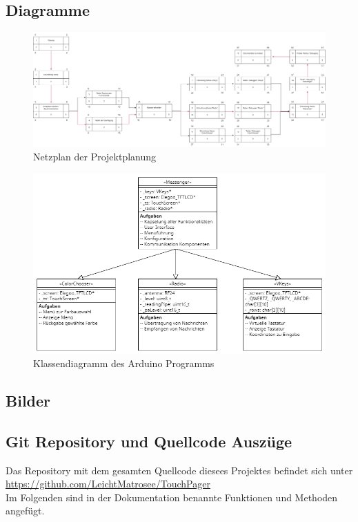\documentclass[a4paper, 11pt]{scrartcl}
\begin{document}
\begin{small}
\subsection{Diagramme}\label{ch:diags}
\begin{figure}[H]
    \begin{center}
        \includegraphics[scale=0.21]{Bilder/Netzplan.png}
        \caption{Netzplan der Projektplanung}\label{diag:netzplan}
    \end{center}
\end{figure}

\begin{figure}[H]
    \begin{center}
        \includegraphics[scale=0.5]{Bilder/Class_Diagram.png}
        \caption{Klassendiagramm des Arduino Programms}\label{diag:classdiag}
    \end{center}
\end{figure}



\subsection{Bilder}


\newpage
\subsection{Git Repository und Quellcode Auszüge}
Das Repository mit dem gesamten Quellcode diesees Projektes befindet sich unter
\\
\url{https://github.com/LeichtMatrosee/TouchPager}
\\
Im Folgenden sind in der Dokumentation benannte Funktionen und Methoden angefügt.


\end{small}
\end{document}
